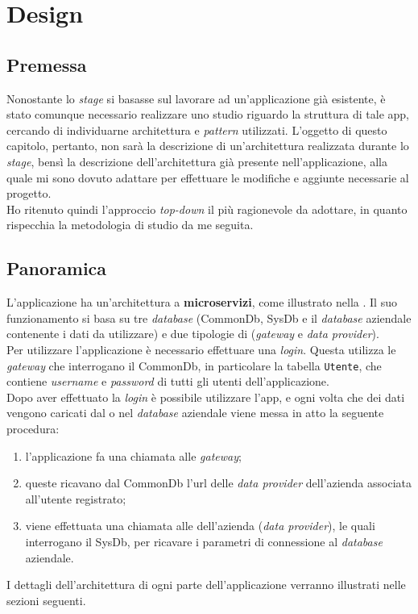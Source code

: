 \chapter{Design}
\label{cap:design}


\section{Premessa}

Nonostante lo \textit{stage} si basasse sul lavorare ad un'applicazione già esistente, è stato comunque necessario realizzare uno studio riguardo la struttura di tale app, cercando di individuarne architettura e \textit{pattern} utilizzati. L'oggetto di questo capitolo, pertanto, non sarà la descrizione di un'architettura realizzata durante lo \textit{stage}, bensì la descrizione dell'architettura già presente nell'applicazione, alla quale mi sono dovuto adattare per effettuare le modifiche e aggiunte necessarie al progetto.\\
Ho ritenuto quindi l'approccio \textit{top-down} il più ragionevole da adottare, in quanto rispecchia la metodologia di studio da me seguita.

\section{Panoramica}

L'applicazione ha un'architettura a \textbf{microservizi}, come illustrato nella . Il suo funzionamento si basa su tre \textit{database} (CommonDb, SysDb e il \textit{database} aziendale contenente i dati da utilizzare) e due tipologie di  (\textit{gateway} e \textit{data provider}).\\
Per utilizzare l'applicazione è necessario effettuare una \textit{login}. Questa utilizza le  \textit{gateway} che interrogano il CommonDb, in particolare la tabella \texttt{Utente}, che contiene \textit{username} e \textit{password} di tutti gli utenti dell'applicazione.\\
Dopo aver effettuato la \textit{login} è possibile utilizzare l'app, e ogni volta che dei dati vengono caricati dal o nel \textit{database} aziendale viene messa in atto la seguente procedura:
\begin{enumerate}
    \item l'applicazione fa una chiamata alle  \textit{gateway};
    \item queste ricavano dal CommonDb l'url delle  \textit{data provider} dell'azienda associata all'utente registrato;
    \item viene effettuata una chiamata alle  dell'azienda (\textit{data provider}), le quali interrogano il SysDb, per ricavare i parametri di connessione al \textit{database} aziendale.
\end{enumerate}
I dettagli dell'architettura di ogni parte dell'applicazione verranno illustrati nelle sezioni seguenti.

